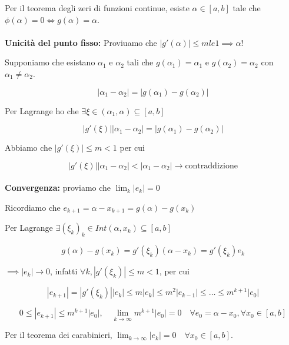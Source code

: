 \documentclass[a4paper, 11pt]{article}
\begin{document}
        Per il teorema degli zeri di funzioni continue, esiste $\alpha \in [a,b]$ tale che $\phi(\alpha) = 0 \iff g(\alpha) = \alpha$.

        \paragraph{}
        \textbf{Unicità del punto fisso:} Proviuamo che $|g'(\alpha)| \leq m le 1 \implies \alpha !$

        Supponiamo che esistano $\alpha_1$ e $\alpha_2$ tali che $g(\alpha_1) = \alpha_1$ e $g(\alpha_2) = \alpha_2$ con $\alpha_1 \neq \alpha_2$.

        $$
            |\alpha_1 - \alpha_2| = |g(\alpha_1) - g(\alpha_2)|
        $$
        
        Per Lagrange ho che $\exists \xi \in (\alpha_1, \alpha) \subseteq [a,b]$
        
        $$
            |g'(\xi)| |\alpha_1 - \alpha_2| = |g(\alpha_1) - g(\alpha_2)|
        $$

        Abbiamo che $|g'(\xi)| \le m < 1$ per cui

        $$
            |g'(\xi)| |\alpha_1 - \alpha_2| < |\alpha_1 - \alpha_2| \rightarrow \text{contraddizione}
        $$

        \paragraph{}
        \textbf{Convergenza:} proviamo che $\lim_{k} |e_k| = 0$
        
        Ricordiamo che $e_{k+1} = \alpha - x_{k+1} = g(\alpha) - g(x_k)$

        Per Lagrange $\exists (\xi_k)_k \in Int(\alpha, x_k) \subseteq [a,b]$

        $$
            g(\alpha) - g(x_k) = g'(\xi_k) (\alpha - x_k) = g'(\xi_k) e_k
        $$

        $\implies |e_k| \rightarrow 0$, infatti $\forall k, |g'(\xi_k)| \leq m < 1$, per cui
        
        $$
            |e_{k+1}| = |g'(\xi_k)| |e_k| \le m |e_k| \le m^2 |e_{k-1}| \le \ldots \le m^{k+1} |e_0|
        $$
        
        $$
            0 \le |e_{k+1}| \le m^{k+1} |e_0|, \quad \lim_{k \to \infty} m^{k+1} |e_0| = 0 \quad \forall e_0 = \alpha - x_0, \forall x_0 \in [a,b]
        $$
        
        Per il teorema dei carabinieri, $\lim_{k \to \infty} |e_k| = 0 \quad \forall x_0 \in [a,b]$. 
\end{document}

